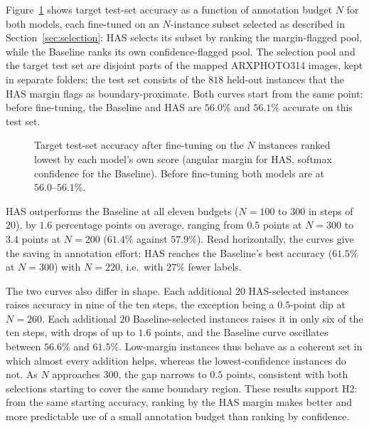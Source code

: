 





Figure~\ref{fig:learning_curve} shows target test-set accuracy as a function of
annotation budget $N$ for both models, each fine-tuned on an $N$-instance
subset selected as described in Section~\ref{sec:selection}: HAS selects
its subset by ranking the margin-flagged pool, while the Baseline ranks
its own confidence-flagged pool. The selection pool and the target
test set are disjoint parts of the mapped ARXPHOTO314 images, kept in
separate folders; the test set consists of the $818$ held-out instances that
the HAS margin flags as boundary-proximate. Both curves start from the same
point: before fine-tuning, the Baseline and HAS are $56.0\%$ and $56.1\%$
accurate on this test set.

\begin{figure}[ht]
    \centering
    \resizebox{0.8\textwidth}{!}{}
    \caption{Target test-set accuracy after fine-tuning on the $N$
    instances ranked lowest by each model's own score (angular margin for HAS,
    softmax confidence for the Baseline). Before fine-tuning both models are at
    $56.0$--$56.1\%$.}
    \label{fig:learning_curve}
\end{figure}

HAS outperforms the Baseline at all eleven budgets ($N=100$ to $300$ in steps
of $20$), by $1.6$ percentage points on average, ranging from $0.5$ points at
$N=300$ to $3.4$ points at $N=200$ ($61.4\%$ against $57.9\%$). Read
horizontally, the curves give the saving in annotation effort: HAS reaches the
Baseline's best accuracy ($61.5\%$ at $N=300$) with $N=220$, i.e.\ with
$27\%$ fewer labels.

The two curves also differ in shape. Each additional $20$ HAS-selected
instances raises accuracy in nine of the ten steps, the exception being a
$0.5$-point dip at $N=260$. Each additional $20$ Baseline-selected instances
raises it in only six of the ten steps, with drops of up to $1.6$ points,
and the Baseline curve oscillates between $56.6\%$ and $61.5\%$. Low-margin
instances thus behave as a coherent set in which almost every addition
helps, whereas the lowest-confidence instances do not. As $N$ approaches
$300$, the gap narrows to $0.5$ points, consistent with both selections
starting to cover the same boundary region. These results support H2: from
the same starting accuracy, ranking by the HAS margin makes better and more
predictable use of a small annotation budget than ranking by confidence.

